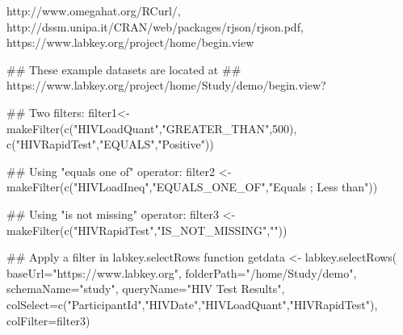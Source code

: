 \begin{References}\relax
http://www.omegahat.org/RCurl/, \\
http://dssm.unipa.it/CRAN/web/packages/rjson/rjson.pdf,\\
https://www.labkey.org/project/home/begin.view
\end{References}
\begin{SeeAlso}\relax
{}
\end{SeeAlso}
\begin{Examples}
\begin{ExampleCode}
## These example datasets are located at 
## https://www.labkey.org/project/home/Study/demo/begin.view?

## Two filters:
filter1<- makeFilter(c("HIVLoadQuant","GREATER_THAN",500), 
c("HIVRapidTest","EQUALS","Positive"))

## Using "equals one of" operator:
filter2 <- makeFilter(c("HIVLoadIneq","EQUALS_ONE_OF","Equals ; Less than"))

## Using "is not missing" operator:
filter3 <- makeFilter(c("HIVRapidTest","IS_NOT_MISSING","")) 

## Apply a filter in labkey.selectRows function
getdata <- labkey.selectRows(
baseUrl="https://www.labkey.org", 
folderPath="/home/Study/demo", 
schemaName="study", 
queryName="HIV Test Results", 
colSelect=c("ParticipantId","HIVDate","HIVLoadQuant","HIVRapidTest"), 
colFilter=filter3)


\end{ExampleCode}
\end{Examples}

